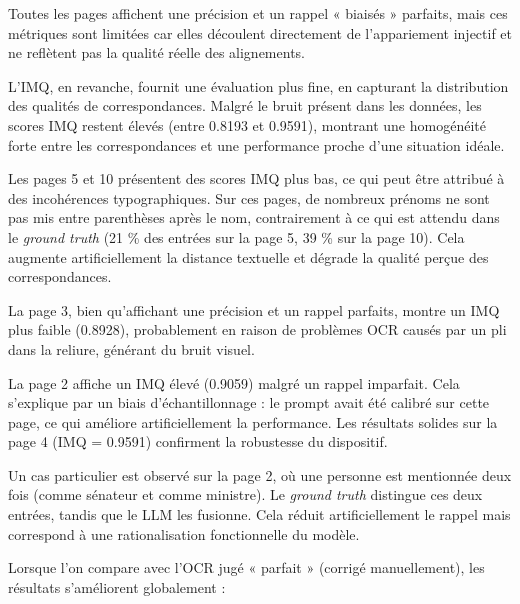 Toutes les pages affichent une précision et un rappel « biaisés » parfaits, mais ces métriques sont limitées car elles découlent directement de l’appariement injectif et ne reflètent pas la qualité réelle des alignements.

L’IMQ, en revanche, fournit une évaluation plus fine, en capturant la distribution des qualités de correspondances. Malgré le bruit présent dans les données, les scores IMQ restent élevés (entre 0.8193 et 0.9591), montrant une homogénéité forte entre les correspondances et une performance proche d'une situation idéale.

Les pages 5 et 10 présentent des scores IMQ plus bas, ce qui peut être attribué à des incohérences typographiques. Sur ces pages, de nombreux prénoms ne sont pas mis entre parenthèses après le nom, contrairement à ce qui est attendu dans le \emph{ground truth} (21 \% des entrées sur la page 5, 39 \% sur la page 10). Cela augmente artificiellement la distance textuelle et dégrade la qualité perçue des correspondances.

La page 3, bien qu’affichant une précision et un rappel parfaits, montre un IMQ plus faible (0.8928), probablement en raison de problèmes OCR causés par un pli dans la reliure, générant du bruit visuel.

La page 2 affiche un IMQ élevé (0.9059) malgré un rappel imparfait. Cela s’explique par un biais d’échantillonnage : le prompt avait été calibré sur cette page, ce qui améliore artificiellement la performance. Les résultats solides sur la page 4 (IMQ = 0.9591) confirment la robustesse du dispositif.

Un cas particulier est observé sur la page 2, où une personne est mentionnée deux fois (comme sénateur et comme ministre). Le \emph{ground truth} distingue ces deux entrées, tandis que le LLM les fusionne. Cela réduit artificiellement le rappel mais correspond à une rationalisation fonctionnelle du modèle.

Lorsque l’on compare avec l’OCR jugé « parfait » (corrigé manuellement), les résultats s’améliorent globalement :

\begin{table}[h]
	\centering
	\caption{Résultats des évaluations des pages avec une qualité OCR optimale.}
	\label{tab:optimal_ocr_results}
\end{table}


